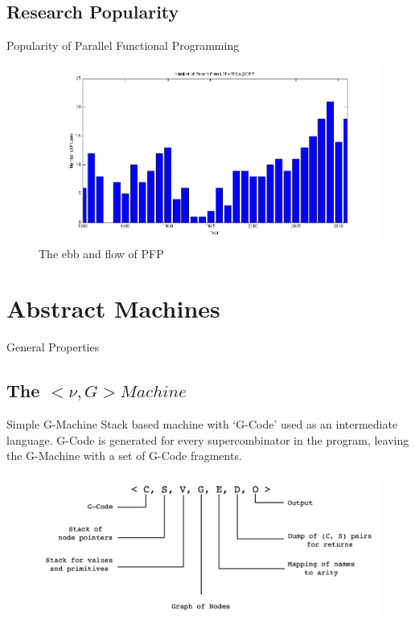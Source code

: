 \documentclass{beamer}
\begin{document}
\subsection[Research Popularity]{Research Popularity}

\begin{frame}[fragile]{Popularity of Parallel Functional Programming}{}
    \begin{figure}
    \centering
        \includegraphics[scale=.4]{figures/numPapers.png}
        \caption{The ebb and flow of PFP}
    \end{figure}

\end{frame}

\section{Abstract Machines}

\begin{frame}{General Properties}
\end{frame}

\subsection[The $< \nu, G> Machine$]{The $< \nu, G> Machine$}

\begin{frame}{Simple G-Machine}
Stack based machine with `G-Code' used as an intermediate language. G-Code is generated for
every supercombinator in the program, leaving the G-Machine with a set of G-Code fragments.  
    \begin{figure}
    \centering
        \includegraphics[scale=.3]{figures/GMachineState.png}
    \end{figure}
\end{frame}
\end{document}
